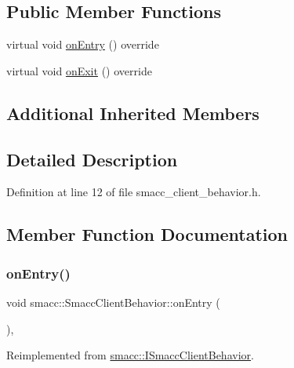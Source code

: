 \subsection*{Public Member Functions}
\begin{DoxyCompactItemize}
\item 
virtual void \hyperlink{classsmacc_1_1SmaccClientBehavior_ad5d3e1f1697c3cfe66c94cadba948493}{on\+Entry} () override
\item 
virtual void \hyperlink{classsmacc_1_1SmaccClientBehavior_a7e4fb6ce81ff96dc172425852d69c0c5}{on\+Exit} () override
\end{DoxyCompactItemize}
\subsection*{Additional Inherited Members}


\subsection{Detailed Description}


Definition at line 12 of file smacc\+\_\+client\+\_\+behavior.\+h.



\subsection{Member Function Documentation}
\mbox{\label{classsmacc_1_1SmaccClientBehavior_ad5d3e1f1697c3cfe66c94cadba948493}} 
\subsubsection{\texorpdfstring{on\+Entry()}{onEntry()}}
{\footnotesize\ttfamily void smacc\+::\+Smacc\+Client\+Behavior\+::on\+Entry (\begin{DoxyParamCaption}{ }\end{DoxyParamCaption})\hspace{0.3cm}{\ttfamily [override]}, {\ttfamily [virtual]}}



Reimplemented from \hyperlink{classsmacc_1_1ISmaccClientBehavior_a3ec24a839087c550e1d62a81e48cf530}{smacc\+::\+I\+Smacc\+Client\+Behavior}.



